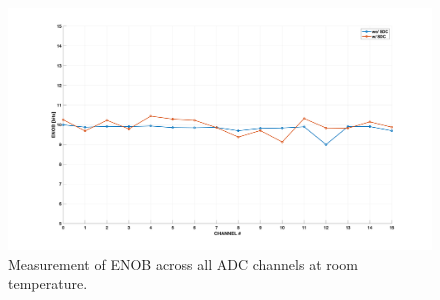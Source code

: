 \begin{figure}[ht!]
  \centering
  \includegraphics[width=1\linewidth]{figures/sdc_measurements/enob_rt.png}
  \caption{Measurement of ENOB across all ADC channels at room temperature.}
  \label{fig;sdc;enob_rt}
\end{figure}

\newpage
\clearpage
